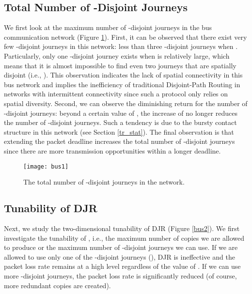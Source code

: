 \documentclass[10pt, conference, letterpaper]{IEEEtran}
\begin{document}
\subsection{Total Number of -Disjoint Journeys}
We first look at the maximum number of -disjoint journeys in the bus communication network (Figure \ref{bus1}). First, it can be observed that there exist very few -disjoint journeys in this network: less than three -disjoint journeys when . Particularly, only one -disjoint journey exists when  is relatively large, which means that it is almost impossible to find even two journeys that are spatially disjoint (i.e., ). This observation indicates the lack of spatial connectivity in this bus network and implies the inefficiency of traditional Disjoint-Path Routing in networks with intermittent connectivity since such a protocol only relies on spatial diversity. Second, we can observe the diminishing return for the number of -disjoint journeys: beyond a certain value of , the increase of  no longer reduces the number of -disjoint journeys. Such a tendency is due to the bursty contact structure in this network (see Section \ref{tr_stat}). The final observation is that extending the packet deadline increases the total number of -disjoint journeys since there are more transmission opportunities within a longer deadline.



\begin{figure}[t]
\begin{center}
\texttt{[image: bus1]}
\caption{The total number of -disjoint journeys in the network.}
\label{bus1}\vspace{-3mm}
\end{center}
\end{figure}

\subsection{Tunability of DJR}
Next, we study the two-dimensional tunability of DJR (Figure \ref{bus2}). We first investigate the tunability of , i.e., the maximum number of copies we are allowed to produce or the maximum number of -disjoint journeys we can use. If we are  allowed to use only one of the -disjoint journeys (), DJR is ineffective and the packet loss rate remains at a high level regardless of the value of . If we can use more -disjoint journeys, the packet loss rate is significantly reduced (of course, more redundant copies are created).
\end{document}
